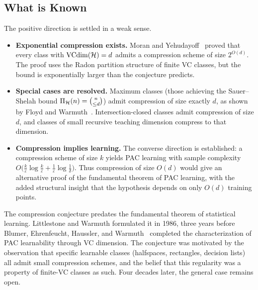 \subsection{What is Known}

The positive direction is settled in a weak sense.

\begin{itemize}[leftmargin=*]
\item \textbf{Exponential compression exists.}
  Moran and Yehudayoff~\cite{MoranYehudayoff2016} proved that every class
  with $\mathrm{VCdim}(\mathcal{H}) = d$ admits a compression scheme of size
  $2^{O(d)}$.  The proof uses the Radon partition structure of finite VC
  classes, but the bound is exponentially larger than the conjecture predicts.

\item \textbf{Special cases are resolved.}  Maximum classes (those achieving
  the Sauer--Shelah bound $\Pi_\mathcal{H}(n) = \binom{n}{\leq d}$)
  admit compression of size exactly $d$, as shown by Floyd and
  Warmuth~\cite{FloydWarmuth1995}.  Intersection-closed classes admit
  compression of size $d$, and classes of small recursive
  teaching dimension compress to that dimension.

\item \textbf{Compression implies learning.}  The converse direction is
  established: a compression scheme of size $k$ yields PAC learning with
  sample complexity $O\bigl(\frac{k}{\varepsilon}\log\frac{k}{\varepsilon}
  + \frac{1}{\varepsilon}\log\frac{1}{\delta}\bigr)$.  Thus compression
  of size $O(d)$ would give an alternative proof of the fundamental theorem
  of PAC learning, with the added structural insight that the hypothesis
  depends on only $O(d)$ training points.
\end{itemize}

\begin{historical}
The compression conjecture predates the fundamental theorem of statistical
learning.  Littlestone and Warmuth formulated it in 1986, three years before
Blumer, Ehrenfeucht, Haussler, and Warmuth~\cite{BlumerEhrenfeuchtHausslerWarmuth1989}
completed the characterization of PAC learnability through VC dimension.
The conjecture was motivated by the observation that specific learnable
classes (halfspaces, rectangles, decision lists) all admit small compression
schemes, and the belief that this regularity was a property of finite-VC
classes as such.  Four decades later, the general case remains open.
\end{historical}

